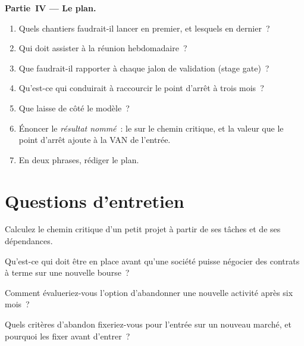 \begin{problem}
\medskip\noindent\textbf{Partie~IV --- Le plan.}
\begin{enumerate}[resume]
\item Quels chantiers faudrait-il lancer en premier, et lesquels en dernier~?
\item Qui doit assister à la réunion hebdomadaire~?
\item Que faudrait-il rapporter à chaque jalon de validation (stage gate)~?
\item Qu'est-ce qui conduirait à raccourcir le point d'arrêt à trois mois~?
\item Que laisse de côté le modèle~?
\item Énoncer le \emph{résultat nommé}~: le  sur le chemin critique, et la valeur que le point d'arrêt ajoute à la VAN de l'entrée.
\item En deux phrases, rédiger le plan.
\end{enumerate}
\end{problem}

\section{Questions d'entretien}

\begin{interviewq}\label{iq:fm:entering-a-new-market:1}
Calculez le chemin critique d'un petit projet à partir de ses tâches et de ses dépendances.
\end{interviewq}

\begin{interviewq}\label{iq:fm:entering-a-new-market:2}
Qu'est-ce qui doit être en place avant qu'une société puisse négocier des contrats à terme sur une nouvelle bourse~?
\end{interviewq}

\begin{interviewq}\label{iq:fm:entering-a-new-market:3}
Comment évalueriez-vous l'option d'abandonner une nouvelle activité après six mois~?
\end{interviewq}

\begin{interviewq}\label{iq:fm:entering-a-new-market:4}
Quels critères d'abandon fixeriez-vous pour l'entrée sur un nouveau marché, et pourquoi les fixer avant d'entrer~?
\end{interviewq}

